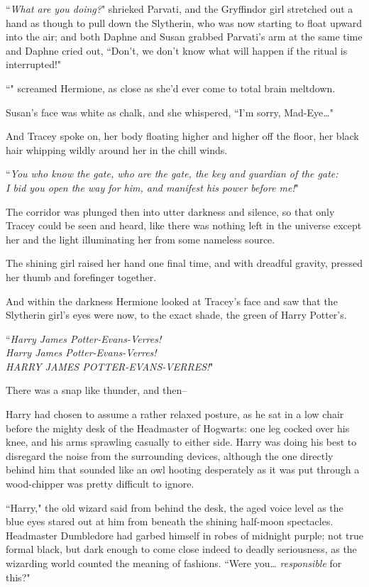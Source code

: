 ``\emph{What are you doing?}" shrieked Parvati, and the Gryffindor girl stretched out a hand as though to pull down the Slytherin, who was now starting to float upward into the air; and both Daphne and Susan grabbed Parvati's arm at the same time and Daphne cried out, ``Don't, we don't know what will happen if the ritual is interrupted!"

``" screamed Hermione, as close as she'd ever come to total brain meltdown.

Susan's face was white as chalk, and she whispered, ``I'm sorry, Mad-Eye{\ldots}"

And Tracey spoke on, her body floating higher and higher off the floor, her black hair whipping wildly around her in the chill winds.

``\emph{You who know the gate, who are the gate, the key and guardian of the gate:\\
I bid you open the way for him, and manifest his power before me!}"

The corridor was plunged then into utter darkness and silence, so that only Tracey could be seen and heard, like there was nothing left in the universe except her and the light illuminating her from some nameless source.

The shining girl raised her hand one final time, and with dreadful gravity, pressed her thumb and forefinger together.

And within the darkness Hermione looked at Tracey's face and saw that the Slytherin girl's eyes were now, to the exact shade, the green of Harry Potter's.

``\emph{Harry James Potter-Evans-Verres!\\
Harry James Potter-Evans-Verres!\\
HARRY JAMES POTTER-EVANS-VERRES!}"\nopagebreak

There was a snap like thunder, and then\---

\later

Harry had chosen to assume a rather relaxed posture, as he sat in a low chair before the mighty desk of the Headmaster of Hogwarts: one leg cocked over his knee, and his arms sprawling casually to either side. Harry was doing his best to disregard the noise from the surrounding devices, although the one directly behind him that sounded like an owl hooting desperately as it was put through a wood-chipper was pretty difficult to ignore.

``Harry," the old wizard said from behind the desk, the aged voice level as the blue eyes stared out at him from beneath the shining half-moon spectacles. Headmaster Dumbledore had garbed himself in robes of midnight purple; not true formal black, but dark enough to come close indeed to deadly seriousness, as the wizarding world counted the meaning of fashions. ``Were you{\ldots} \emph{responsible} for this?"

